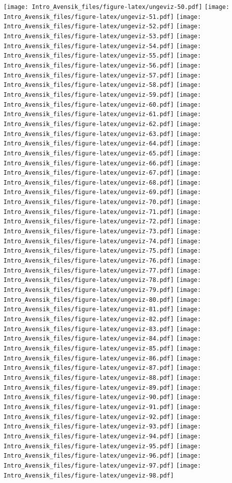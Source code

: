 \documentclass[
]{book}
\begin{document}
\texttt{[image: Intro\_Avensik\_files/figure-latex/ungeviz-50.pdf]} \texttt{[image: Intro\_Avensik\_files/figure-latex/ungeviz-51.pdf]} \texttt{[image: Intro\_Avensik\_files/figure-latex/ungeviz-52.pdf]} \texttt{[image: Intro\_Avensik\_files/figure-latex/ungeviz-53.pdf]} \texttt{[image: Intro\_Avensik\_files/figure-latex/ungeviz-54.pdf]} \texttt{[image: Intro\_Avensik\_files/figure-latex/ungeviz-55.pdf]} \texttt{[image: Intro\_Avensik\_files/figure-latex/ungeviz-56.pdf]} \texttt{[image: Intro\_Avensik\_files/figure-latex/ungeviz-57.pdf]} \texttt{[image: Intro\_Avensik\_files/figure-latex/ungeviz-58.pdf]} \texttt{[image: Intro\_Avensik\_files/figure-latex/ungeviz-59.pdf]} \texttt{[image: Intro\_Avensik\_files/figure-latex/ungeviz-60.pdf]} \texttt{[image: Intro\_Avensik\_files/figure-latex/ungeviz-61.pdf]} \texttt{[image: Intro\_Avensik\_files/figure-latex/ungeviz-62.pdf]} \texttt{[image: Intro\_Avensik\_files/figure-latex/ungeviz-63.pdf]} \texttt{[image: Intro\_Avensik\_files/figure-latex/ungeviz-64.pdf]} \texttt{[image: Intro\_Avensik\_files/figure-latex/ungeviz-65.pdf]} \texttt{[image: Intro\_Avensik\_files/figure-latex/ungeviz-66.pdf]} \texttt{[image: Intro\_Avensik\_files/figure-latex/ungeviz-67.pdf]} \texttt{[image: Intro\_Avensik\_files/figure-latex/ungeviz-68.pdf]} \texttt{[image: Intro\_Avensik\_files/figure-latex/ungeviz-69.pdf]} \texttt{[image: Intro\_Avensik\_files/figure-latex/ungeviz-70.pdf]} \texttt{[image: Intro\_Avensik\_files/figure-latex/ungeviz-71.pdf]} \texttt{[image: Intro\_Avensik\_files/figure-latex/ungeviz-72.pdf]} \texttt{[image: Intro\_Avensik\_files/figure-latex/ungeviz-73.pdf]} \texttt{[image: Intro\_Avensik\_files/figure-latex/ungeviz-74.pdf]} \texttt{[image: Intro\_Avensik\_files/figure-latex/ungeviz-75.pdf]} \texttt{[image: Intro\_Avensik\_files/figure-latex/ungeviz-76.pdf]} \texttt{[image: Intro\_Avensik\_files/figure-latex/ungeviz-77.pdf]} \texttt{[image: Intro\_Avensik\_files/figure-latex/ungeviz-78.pdf]} \texttt{[image: Intro\_Avensik\_files/figure-latex/ungeviz-79.pdf]} \texttt{[image: Intro\_Avensik\_files/figure-latex/ungeviz-80.pdf]} \texttt{[image: Intro\_Avensik\_files/figure-latex/ungeviz-81.pdf]} \texttt{[image: Intro\_Avensik\_files/figure-latex/ungeviz-82.pdf]} \texttt{[image: Intro\_Avensik\_files/figure-latex/ungeviz-83.pdf]} \texttt{[image: Intro\_Avensik\_files/figure-latex/ungeviz-84.pdf]} \texttt{[image: Intro\_Avensik\_files/figure-latex/ungeviz-85.pdf]} \texttt{[image: Intro\_Avensik\_files/figure-latex/ungeviz-86.pdf]} \texttt{[image: Intro\_Avensik\_files/figure-latex/ungeviz-87.pdf]} \texttt{[image: Intro\_Avensik\_files/figure-latex/ungeviz-88.pdf]} \texttt{[image: Intro\_Avensik\_files/figure-latex/ungeviz-89.pdf]} \texttt{[image: Intro\_Avensik\_files/figure-latex/ungeviz-90.pdf]} \texttt{[image: Intro\_Avensik\_files/figure-latex/ungeviz-91.pdf]} \texttt{[image: Intro\_Avensik\_files/figure-latex/ungeviz-92.pdf]} \texttt{[image: Intro\_Avensik\_files/figure-latex/ungeviz-93.pdf]} \texttt{[image: Intro\_Avensik\_files/figure-latex/ungeviz-94.pdf]} \texttt{[image: Intro\_Avensik\_files/figure-latex/ungeviz-95.pdf]} \texttt{[image: Intro\_Avensik\_files/figure-latex/ungeviz-96.pdf]} \texttt{[image: Intro\_Avensik\_files/figure-latex/ungeviz-97.pdf]} \texttt{[image: Intro\_Avensik\_files/figure-latex/ungeviz-98.pdf]} 
\end{document}
